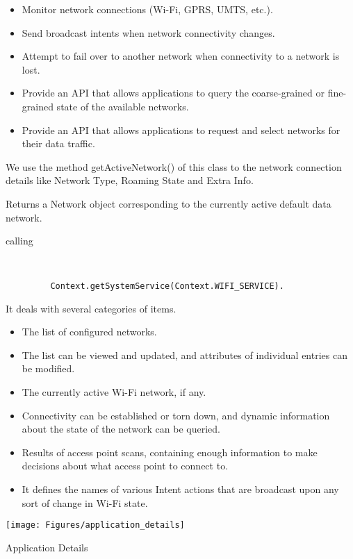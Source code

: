 \begin{itemize}

 	\item    Monitor network connections (Wi-Fi, GPRS, UMTS, etc.).
    \item Send broadcast intents when network connectivity changes.
    \item Attempt to fail over to another network when connectivity to a network is lost.
    \item Provide an API that allows applications to query the coarse-grained or fine-grained state of the available networks.
    \item Provide an API that allows applications to request and select networks for their data traffic.
\end{itemize}
We use the method  getActiveNetwork() of this class to the network connection details like Network Type, Roaming State and Extra Info.

Returns a Network object corresponding to the currently active default data network.  

calling
\begin{lstlisting}


         Context.getSystemService(Context.WIFI_SERVICE).  
         \end{lstlisting}
         It deals with several categories of items.
\begin{itemize}

	\item The list of configured networks.  
	\item The list can be viewed and updated, and attributes of individual entries can be modified.
    \item The currently active Wi-Fi network, if any.  
    \item Connectivity can be established or torn down, and dynamic information about the state of the network can be queried.
    \item Results of access point scans, containing enough information to make decisions about what access point to connect to.
    \item It defines the names of various Intent actions that are broadcast upon any sort of change in Wi-Fi state.  
    \end{itemize}


  \begin{minipage}{0.24\textwidth}
    \texttt{[image: Figures/application\_details]}
    \caption{Application Details}
    \label{applicationdetails}
  \end{minipage}

